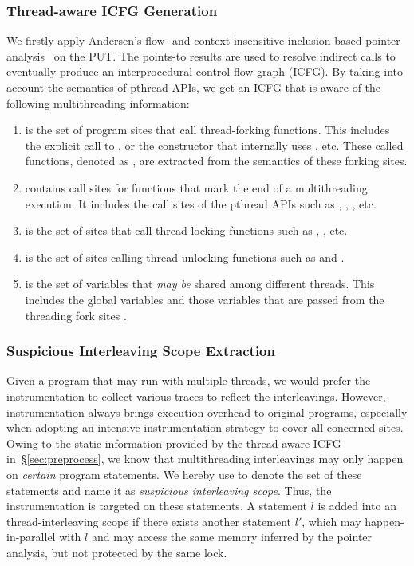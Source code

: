 \subsubsection{Thread-aware ICFG Generation}\label{sec:tcg}
We firstly apply Andersen's flow- and context-insensitive inclusion-based pointer analysis~\cite{Andersen94programanalysis} on the PUT. The points-to results are used to resolve indirect calls to eventually produce an interprocedural control-flow graph (ICFG). By taking into account the semantics of pthread APIs, we get an ICFG that is aware of the following multithreading information:
\begin{enumerate}[(1)]
    \item \TStart is the set of program sites that call thread-forking functions. This includes the explicit call to , or the  constructor that internally uses , etc. These called functions, denoted as \FSStart, are extracted from the semantics of these forking sites.
\item \TEnd contains call sites for functions that mark the end of a multithreading execution. It includes the call sites of the pthread APIs such as , , , etc.
    \item \TLock is the set of sites that call thread-locking functions such as , , etc.
\item \TUnLock is the set of sites calling thread-unlocking functions such as  and .
    \item \TSharedVar is the set of variables that \emph{may be} shared among different threads. This includes the global variables and those variables that are passed from the threading fork sites \TStart.
\end{enumerate}

\subsubsection{Suspicious Interleaving Scope Extraction}\label{sec:extract}
Given a program that may run with multiple threads, we would prefer the instrumentation to collect various traces to reflect the interleavings. However, instrumentation always brings execution overhead to original programs, especially when adopting an intensive instrumentation strategy to cover all concerned sites.  Owing to the static information provided by the thread-aware ICFG in~\S\ref{sec:preprocess}, we know that multithreading interleavings may only happen on \emph{certain} program statements. We hereby use \mtiscope to denote the set of these statements and name it as \emph{suspicious interleaving scope}. Thus, the instrumentation is targeted on these statements. A statement $l$ is added into an thread-interleaving scope if there exists another statement $l'$, which may happen-in-parallel with $l$ and may access the same memory inferred by the pointer analysis, but not protected by the same lock.




